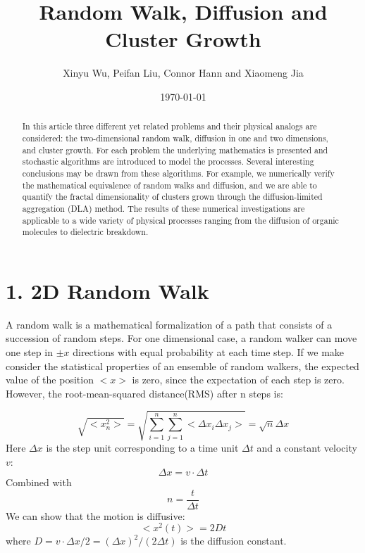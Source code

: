 \documentclass[aps,prl,preprint,superscriptaddress]{revtex4}
\begin{document}
	
	
	\title{Random Walk, Diffusion and Cluster Growth}%
	
	\author{Xinyu Wu, Peifan Liu, Connor Hann and Xiaomeng Jia}
	
	
	\date{\today}
	
	\begin{abstract}
		In this article three different yet related problems and their physical analogs are considered: the two-dimensional random walk, diffusion in one and two dimensions, and cluster growth. For each problem the underlying mathematics is presented and stochastic algorithms are introduced to model the processes. Several interesting conclusions may be drawn from these algorithms. For example, we numerically verify the mathematical equivalence of random walks and diffusion, and we are able to quantify the fractal dimensionality of clusters grown through the diffusion-limited aggregation (DLA) method. The results of these numerical investigations are applicable to a wide variety of physical processes ranging from the diffusion of organic molecules to dielectric breakdown. 
	\end{abstract}
	
	\maketitle
	
	
	
	\section{1. 2D Random Walk} 
	
	
	A random walk is a mathematical formalization of a path that consists of a succession of random steps. For one dimensional case, a random walker can move one step in $\pm x$ directions with equal probability at each time step. If we make consider the statistical properties of  an ensemble of random walkers, the expected value of the position $ <x> $ is zero, since the expectation of each step is zero. However, the root-mean-squared distance(RMS) after n steps is:
	
	\begin{equation}
	\sqrt{<x_n^2>} = \sqrt{\sum\limits_{i=1}^{n}\sum\limits_{j=1}^{n}<\Delta x_i\Delta x_j>} = \sqrt{n}\Delta x
	\end{equation} 
	Here $\Delta x$ is the step unit corresponding to a time unit $\Delta t$ and a constant velocity $v$:
	\begin{equation}
	\Delta x = v\cdot \Delta t
	\end{equation} 
	Combined with
	\begin{equation}
	n = \frac{t}{\Delta t}
	\end{equation}
	We can show that the motion is diffusive:
	\begin{equation}
	<x^2(t)> = 2Dt
	\end{equation}
	where $D = v\cdot\Delta x/2 = (\Delta x)^2/(2\Delta t)$ is the diffusion constant.
	
\end{document}

